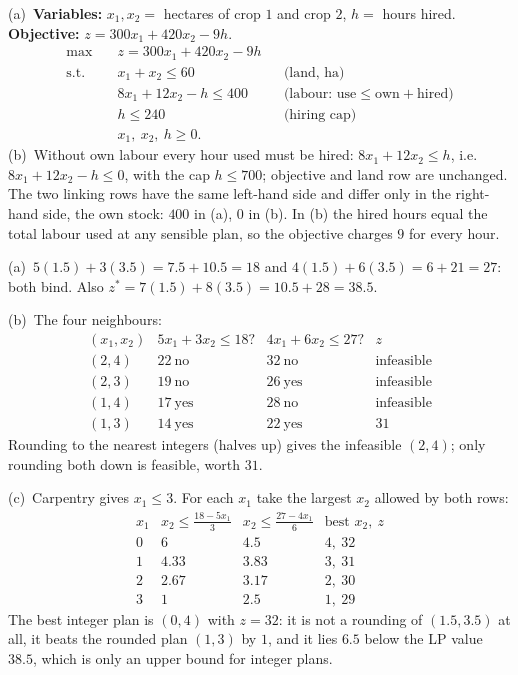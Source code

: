 \begin{solutions}
  \item (a)~\textbf{Variables:} $x_1,x_2=$ hectares of crop $1$ and crop
        $2$, $h=$ hours hired. \textbf{Objective:} $z=300x_1+420x_2-9h$.
        \[
          \begin{aligned}
            \max\quad & z=300x_1+420x_2-9h\\
            \text{s.t.}\quad & x_1+x_2\le 60 &&\text{(land, ha)}\\
            & 8x_1+12x_2-h\le 400 &&\text{(labour: use}\le\text{own}+\text{hired)}\\
            & h\le 240 &&\text{(hiring cap)}\\
            & x_1,\ x_2,\ h\ge 0 .
          \end{aligned}
        \]
        (b)~Without own labour every hour used must be hired:
        $8x_1+12x_2\le h$, i.e.\ $8x_1+12x_2-h\le 0$, with the cap
        $h\le 700$; objective and land row are unchanged. The two linking
        rows have the same left-hand side and differ only in the
        right-hand side, the own stock: $400$ in (a), $0$ in (b). In (b)
        the hired hours equal the total labour used at any sensible plan,
        so the objective charges $9$ for every hour.

  \item (a)~$5(1.5)+3(3.5)=7.5+10.5=18$ and
        $4(1.5)+6(3.5)=6+21=27$: both bind. Also
        $z^{*}=7(1.5)+8(3.5)=10.5+28=38.5$.

        (b)~The four neighbours:
        \[
          \begin{array}{c|c|c|c}
            (x_1,x_2) & 5x_1+3x_2\le 18? & 4x_1+6x_2\le 27? & z\\\hline
            (2,4) & 22\ \text{no} & 32\ \text{no} & \text{infeasible}\\
            (2,3) & 19\ \text{no} & 26\ \text{yes} & \text{infeasible}\\
            (1,4) & 17\ \text{yes} & 28\ \text{no} & \text{infeasible}\\
            (1,3) & 14\ \text{yes} & 22\ \text{yes} & 31
          \end{array}
        \]
        Rounding to the nearest integers (halves up) gives the infeasible
        $(2,4)$; only rounding both down is feasible, worth $31$.

        (c)~Carpentry gives $x_1\le 3$. For each $x_1$ take the largest
        $x_2$ allowed by both rows:
        \[
          \begin{array}{c|c|c|c}
            x_1 & x_2\le\frac{18-5x_1}{3} & x_2\le\frac{27-4x_1}{6} &
              \text{best }x_2,\ z\\\hline
            0 & 6 & 4.5 & 4,\ 32\\
            1 & 4.33 & 3.83 & 3,\ 31\\
            2 & 2.67 & 3.17 & 2,\ 30\\
            3 & 1 & 2.5 & 1,\ 29
          \end{array}
        \]
        The best integer plan is $(0,4)$ with $z=32$: it is not a rounding
        of $(1.5,3.5)$ at all, it beats the rounded plan $(1,3)$ by $1$,
        and it lies $6.5$ below the LP value $38.5$, which is only an
        upper bound for integer plans.


\end{solutions}
